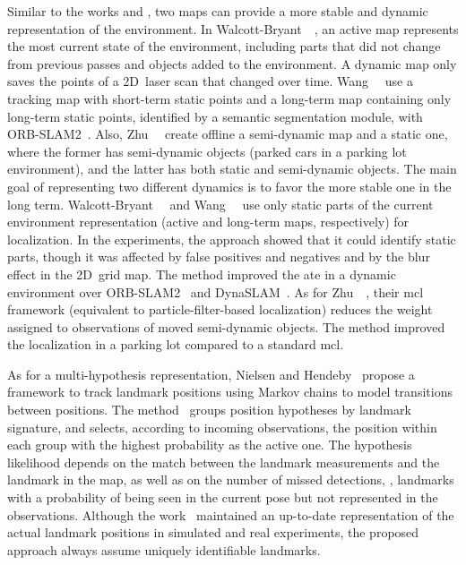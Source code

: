 Similar to the works \cite{dayoub:ras:2011} and \cite{bacca:ras:2013}, two maps
can provide a more stable and dynamic representation of the environment.
In Walcott-Bryant~\etal~\cite{walcott-bryant:iros:2012},
an active map represents the most current state of the environment,
including parts that did not change from previous passes
and objects added to the environment.
A dynamic map only saves the points of a 2D~laser scan that changed over time.
Wang~\etal~\cite{wang:icra:2019} use a tracking map with
short-term static points and a long-term map containing
only long-term static points, identified by a semantic segmentation module,
with ORB-SLAM2~\cite{mur-artal-tardos:tro:2017}.
Also, Zhu~\etal~\cite{zhu:icra:2021} create offline a semi-dynamic map
and a static one, where the former has semi-dynamic objects
(parked cars in a parking lot environment),
and the latter has both static and semi-dynamic objects.
The main goal of representing two different dynamics is to favor
the more stable one in the long term.
Walcott-Bryant~\etal~\cite{walcott-bryant:iros:2012} and
Wang~\etal~\cite{wang:icra:2019} use only static parts of the current
environment representation (active and long-term maps, respectively)
for localization. In the experiments,
the approach \cite{walcott-bryant:iros:2012} showed that
it could identify static parts, though it was affected by false positives
and negatives and by the blur effect in the 2D~grid map.
The method \cite{wang:icra:2019} improved the \gls{ate} in a dynamic environment
over ORB-SLAM2~\cite{mur-artal-tardos:tro:2017} and
DynaSLAM~\cite{bescos:ral:2018}.
As for Zhu~\etal~\cite{zhu:icra:2021}, their \gls{mcl} framework
(equivalent to particle-filter-based localization)
reduces the weight assigned to observations of moved semi-dynamic objects.
The method improved the localization in a parking lot
compared to a standard \gls{mcl}.

As for a multi-hypothesis representation,
Nielsen and Hendeby~\cite{nielsen-hendeby:tiv:2023} propose a framework to track
landmark positions using Markov chains to model transitions between positions.
The method~\cite{nielsen-hendeby:tiv:2023} groups position hypotheses
by landmark signature, and selects, according to incoming observations,
the position within each group with the highest probability as the active one.
The hypothesis likelihood depends on the match between the landmark measurements
and the landmark in the map, as well as on the number of missed detections, \ie,
landmarks with a probability of being seen in the current pose
but not represented in the observations.
Although the work~\cite{nielsen-hendeby:tiv:2023} maintained an up-to-date
representation of the actual landmark positions in simulated and real
experiments, the proposed approach always assume
uniquely identifiable landmarks.

